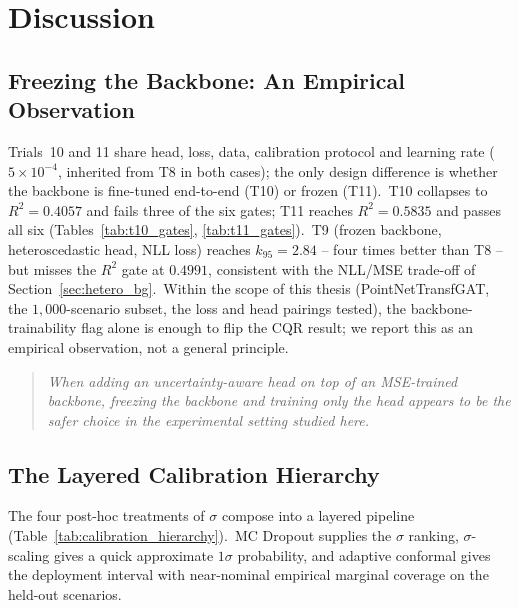 
\chapter{Discussion}\label{chapter:discussion}

\section{Freezing the Backbone: An Empirical Observation}\label{sec:freeze_principle}

Trials~10 and 11 share head, loss, data, calibration protocol and learning rate ($5\times10^{-4}$, inherited from T8 in both cases); the only design difference is whether the backbone is fine-tuned end-to-end (T10) or frozen (T11).\ T10 collapses to $R^2 = 0.4057$ and fails three of the six gates; T11 reaches $R^2 = 0.5835$ and passes all six (Tables~\ref{tab:t10_gates}, \ref{tab:t11_gates}).\ T9 (frozen backbone, heteroscedastic head, NLL loss) reaches $k_{95} = 2.84$ -- four times better than T8 -- but misses the $R^2$ gate at $0.4991$, consistent with the NLL/MSE trade-off of Section~\ref{sec:hetero_bg}.\ Within the scope of this thesis (PointNetTransfGAT, the $1{,}000$-scenario subset, the loss and head pairings tested), the backbone-trainability flag alone is enough to flip the CQR result; we report this as an empirical observation, not a general principle.

\begin{quote}\itshape
When adding an uncertainty-aware head on top of an MSE-trained backbone, freezing the backbone and training only the head appears to be the safer choice in the experimental setting studied here.
\end{quote}

\section{The Layered Calibration Hierarchy}\label{sec:calibration_hierarchy}

The four post-hoc treatments of $\sigma$ compose into a layered pipeline (Table~\ref{tab:calibration_hierarchy}).\ MC Dropout supplies the $\sigma$ ranking, $\sigma$-scaling gives a quick approximate $1\sigma$ probability, and adaptive conformal gives the deployment interval with near-nominal empirical marginal coverage on the held-out scenarios.

